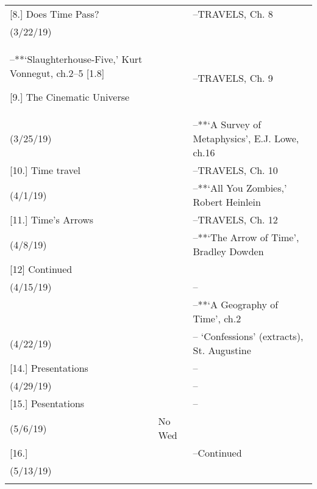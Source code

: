 \documentclass[article,oneside]{memoir}
\begin{document}
\begin{center}
\begin{longtable}{p{4.5cm}p{2cm}p{6cm}}
[8.] Does Time Pass?  		   	& 	   		& --TRAVELS, Ch. 8\\
(3/22/19)				         & 			    	& \\--**`Slaughterhouse-Five,' Kurt Vonnegut, ch.2--5 [1.8\baselineskip]	

[9.] The Cinematic Universe 	& 		& --TRAVELS, Ch. 9 \\
(3/25/19)				      	&	      	& --**`A Survey of Metaphysics', E.J. Lowe, ch.16  \\  [1.8\baselineskip]

[10.] Time travel		& 			& --TRAVELS, Ch. 10  \\
(4/1/19)		            		&		      		& --**`All You Zombies,'  Robert Heinlein \\  [1.8\baselineskip]

[11.] Time's Arrows			    	& 			& --TRAVELS, Ch. 12 \\
(4/8/19)				        &		    	& --**`The Arrow of Time', Bradley Dowden \\ [1.8\baselineskip]



[12] Continued		 	& 		& \\
(4/15/19)				      	&			      	& --\\\[1.8\baselineskip]

[13.] Our Perception of Time 	    & 		& --**`A Geography of Time', ch.2\\
(4/22/19)			      		&			      	& -- `Confessions' (extracts),  St. Augustine \\ [1.8\baselineskip]


[14.] Presentations		     	& 			& -- \\ 
(4/29/19)				      	&		   	& -- \\ [1.8\baselineskip]

						
[15.] Pesentations	      		& 			&  -- \\
(5/6/19)				      	& No Wed			  &  \\  [1.8\baselineskip]

[16.] 			 	      		& 				&  --Continued \\
(5/13/19)				      	&			      	&  \\  [1.8\baselineskip]




\]
\end{longtable}
\end{center}
\end{document}
